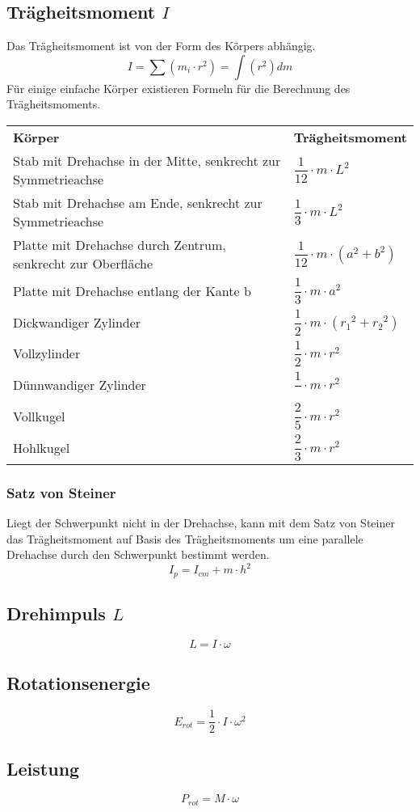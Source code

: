 \subsection{Trägheitsmoment $I$}
Das Trägheitsmoment ist von der Form des Körpers abhängig. 
\[ I = \sum (m_i \cdot r^2) = \int(r^2)dm\]
Für einige einfache Körper existieren Formeln für die Berechnung des 
Trägheitsmoments. 
\begin{table}[h!]
\begin{tabular}{m{} m{}}
\rowcolor{white}
\textbf{Körper} 
& \textbf{Trägheitsmoment} \\

\rowcolor{lgray}
Stab mit Drehachse in der Mitte, senkrecht zur Symmetrieachse 
& $\dfrac{1}{12} \cdot m \cdot L^2$ \\

\rowcolor{white}
Stab mit Drehachse am Ende, senkrecht zur Symmetrieachse 
& $\dfrac{1}{3} \cdot m \cdot L^2$ \\

\rowcolor{lgray}
Platte mit Drehachse durch Zentrum, senkrecht zur Oberfläche
& $\dfrac{1}{12} \cdot m \cdot (a^2 + b^2)$ \\

\rowcolor{white}
Platte mit Drehachse entlang der Kante b
& $\dfrac{1}{3} \cdot m \cdot a^2$ \\

\rowcolor{lgray}
Dickwandiger Zylinder
& $\dfrac{1}{2} \cdot m \cdot ({r_1}^2 + {r_2}^2)$ \\

\rowcolor{white}
Vollzylinder
& $\dfrac{1}{2} \cdot m \cdot r^2$ \\

\rowcolor{lgray}
Dünnwandiger Zylinder
& $\dfrac{1}{} \cdot m \cdot r^2$ \\

\rowcolor{white}
Vollkugel
& $\dfrac{2}{5} \cdot m \cdot r^2$ \\

\rowcolor{lgray}
Hohlkugel
& $\dfrac{2}{3} \cdot m \cdot r^2$ \\
\end{tabular}
\end{table}

\subsubsection{Satz von Steiner}
Liegt der Schwerpunkt nicht in der Drehachse, kann mit dem Satz von Steiner 
das Trägheitsmoment auf Basis des Trägheitsmoments um eine parallele Drehachse 
durch den Schwerpunkt bestimmt werden. 
\[ I_p = I_{cm} + m \cdot h^2 \]


\subsection{Drehimpuls $L$}
\[ L = I \cdot \omega \]

\subsection{Rotationsenergie}
\[ E_{rot} = \frac{1}{2} \cdot I \cdot \omega^2 \]

\subsection{Leistung}
\[ P_{rot} = M \cdot \omega \]

